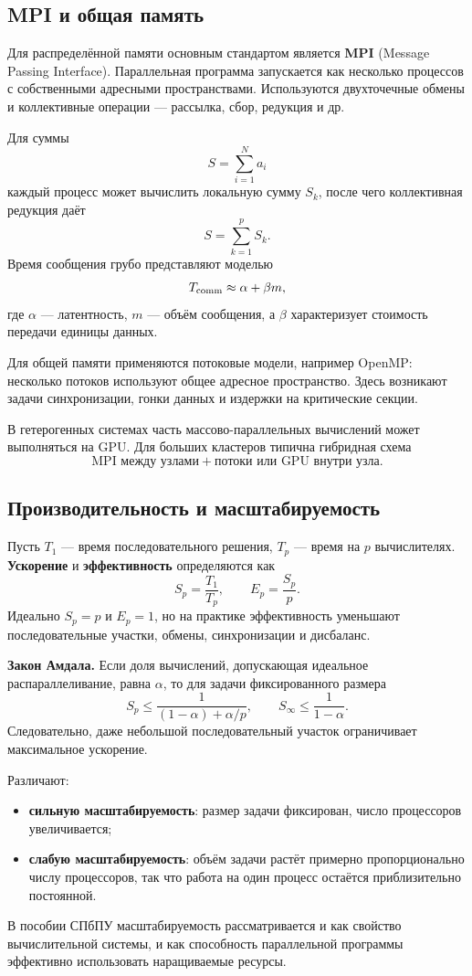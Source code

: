 \subsection{MPI и общая память}

Для распределённой памяти основным стандартом является \textbf{MPI} (Message Passing Interface). Параллельная программа запускается как несколько процессов с собственными адресными пространствами. Используются двухточечные обмены и коллективные операции --- рассылка, сбор, редукция и др.

Для суммы
\[
S=\sum_{i=1}^{N}a_i
\]
каждый процесс может вычислить локальную сумму $S_k$, после чего коллективная редукция даёт
\[
S=\sum_{k=1}^{p}S_k.
\]
Время сообщения грубо представляют моделью
\[
T_{\rm comm}\approx \alpha+\beta m,
\]
где $\alpha$ --- латентность, $m$ --- объём сообщения, а $\beta$ характеризует стоимость передачи единицы данных.

Для общей памяти применяются потоковые модели, например OpenMP: несколько потоков используют общее адресное пространство. Здесь возникают задачи синхронизации, гонки данных и издержки на критические секции.

В гетерогенных системах часть массово-параллельных вычислений может выполняться на GPU. Для больших кластеров типична гибридная схема
\[
\text{MPI между узлами}+\text{потоки или GPU внутри узла}.
\]

\subsection{Производительность и масштабируемость}

Пусть $T_1$ --- время последовательного решения, $T_p$ --- время на $p$ вычислителях. \textbf{Ускорение} и \textbf{эффективность} определяются как
\[
S_p=\frac{T_1}{T_p},
\qquad
E_p=\frac{S_p}{p}.
\]
Идеально $S_p=p$ и $E_p=1$, но на практике эффективность уменьшают последовательные участки, обмены, синхронизации и дисбаланс.

\textbf{Закон Амдала.} Если доля вычислений, допускающая идеальное распараллеливание, равна $\alpha$, то для задачи фиксированного размера
\[
S_p\le
\frac{1}{(1-\alpha)+\alpha/p},
\qquad
S_{\infty}\le \frac{1}{1-\alpha}.
\]
Следовательно, даже небольшой последовательный участок ограничивает максимальное ускорение.

Различают:
\begin{itemize}
\item \textbf{сильную масштабируемость}: размер задачи фиксирован, число процессоров увеличивается;
\item \textbf{слабую масштабируемость}: объём задачи растёт примерно пропорционально числу процессоров, так что работа на один процесс остаётся приблизительно постоянной.
\end{itemize}
В пособии СПбПУ масштабируемость рассматривается и как свойство вычислительной системы, и как способность параллельной программы эффективно использовать наращиваемые ресурсы.

